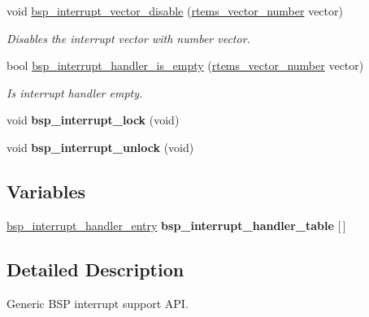 \begin{DoxyCompactItemize}
void \mbox{\hyperlink{group__bsp__interrupt_ga5428b914d0cb037e9b3f7cb2b758cabd}{bsp\+\_\+interrupt\+\_\+vector\+\_\+disable}} (\mbox{\hyperlink{group__ClassicINTR_ga3e434c197d99f128e78cae4d9358bd8b}{rtems\+\_\+vector\+\_\+number}} vector)
\begin{DoxyCompactList}\small\item\em Disables the interrupt vector with number {\itshape vector}. \end{DoxyCompactList}\item 
bool \mbox{\hyperlink{group__bsp__interrupt_ga0ab406af223fad2abc336b84597c7008}{bsp\+\_\+interrupt\+\_\+handler\+\_\+is\+\_\+empty}} (\mbox{\hyperlink{group__ClassicINTR_ga3e434c197d99f128e78cae4d9358bd8b}{rtems\+\_\+vector\+\_\+number}} vector)
\begin{DoxyCompactList}\small\item\em Is interrupt handler empty. \end{DoxyCompactList}\item 
\mbox{\label{irq-generic_8h_ab75d8a53e54d74ff856b3575fd9b31b3}} 
void {\bfseries bsp\+\_\+interrupt\+\_\+lock} (void)
\item 
\mbox{\label{irq-generic_8h_ac03ee575b40103f0977a23845fca158b}} 
void {\bfseries bsp\+\_\+interrupt\+\_\+unlock} (void)
\end{DoxyCompactItemize}
\subsection*{Variables}
\begin{DoxyCompactItemize}
\item 
\mbox{\label{irq-generic_8h_aecb51d30e4dd603ec0a8ac2ee56f6a26}} 
\mbox{\hyperlink{structbsp__interrupt__handler__entry}{bsp\+\_\+interrupt\+\_\+handler\+\_\+entry}} {\bfseries bsp\+\_\+interrupt\+\_\+handler\+\_\+table} \mbox{[}$\,$\mbox{]}
\end{DoxyCompactItemize}


\subsection{Detailed Description}
Generic B\+SP interrupt support A\+PI. 

